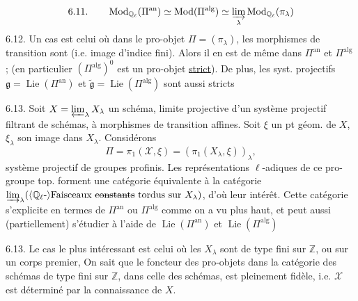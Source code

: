 

\[
6.11.\qquad \operatorname{Mod}_{\mathbb{Q}_\ell}(\Pi^{\mathrm{an}})\simeq
\operatorname{Mod}(\Pi^{\mathrm{alg}})\simeq
\varinjlim_\lambda\operatorname{Mod}_{\mathbb{Q}_\ell}(\pi_\lambda)
\]
6.12. Un cas  est celui où dans le 
pro-objet $\Pi=(\pi_\lambda)$, les morphismes de transition sont
 (i.e. image d'indice fini). Alors il en est de même
dans $\Pi^{\mathrm{an}}$ et $\Pi^{\mathrm{alg}}$ ; (en particulier
$(\Pi^{\mathrm{alg}})^0$ est un pro-objet \uline{strict}). De plus, les syst.
projectifs $\mathfrak{g}=\operatorname{Lie}(\Pi^{\mathrm{an}})$ et
$\widetilde{\mathfrak{g}}=\operatorname{Lie}(\Pi^{\mathrm{alg}})$ sont aussi
stricts \unsure{\ldots}

6.13. Soit $X=\varprojlim_\lambda X_\lambda$ un schéma, limite projective
d'un système projectif filtrant 
de schémas, à morphismes de transition affines. Soit $\xi$ un pt géom.
de $X$, $\xi_\lambda$ son image dans $X_\lambda$. Considérons
\[
\Pi=\pi_1(\mathscr{X},\xi)=(\pi_1(X_\lambda,\xi))_\lambda,
\]
système projectif de groupes profinis. Les représentations
$\ell$-adiques de ce  pro-groupe top. forment une
catégorie équivalente à la catégorie
$\varinjlim_\lambda(\inserted{\mathbb{Q}_\ell\text{-}}\text{Faisceaux
\deleted{constants} tordus sur }X_\lambda)$, d'où leur intérêt. Cette
catégorie s'explicite en termes de $\Pi^{\mathrm{an}}$ ou $\Pi^{\mathrm{alg}}$
comme on a vu plus haut, et peut aussi (partiellement) s'étudier à l'aide
de $\operatorname{Lie}(\Pi^{\mathrm{an}})$ et
$\operatorname{Lie}(\Pi^{\mathrm{alg}})$

6.13. Le cas le plus intéressant est celui où les $X_\lambda$ sont de type
 fini sur $\mathbb{Z}$, ou sur un corps
premier,  On sait que le foncteur
 des pro-objets dans la catégorie des schémas de type fini
sur $\mathbb{Z}$, dans celle des schémas, est pleinement fidèle, i.e.
$\mathscr{X}$ est déterminé par la connaissance de $X$.

